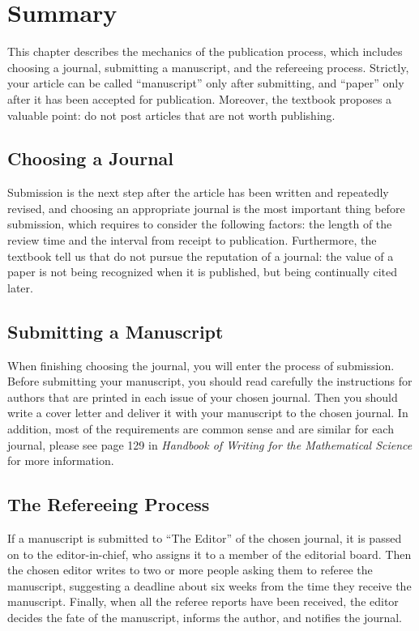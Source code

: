 
\section{Summary}
This chapter describes the mechanics of the publication process, which includes choosing a journal, submitting a manuscript, and the refereeing process. Strictly, your article can be called ``manuscript'' only after submitting, and ``paper'' only after it has been accepted for publication.
Moreover, the textbook proposes a valuable point: do not post articles that are not worth publishing.

\subsection{Choosing a Journal}
Submission is the next step after the article has been written and repeatedly revised, and choosing an appropriate journal is the most important thing before submission, which requires to consider the following factors: the length of the review time and the interval from receipt to publication.
Furthermore, the textbook tell us that do not pursue the reputation of a journal: the value of a paper is not being recognized when it is published, but being continually cited later.


\subsection{Submitting a Manuscript}
When finishing choosing the journal, you will enter the process of submission. Before submitting your manuscript, you should read carefully the instructions for authors that are printed in each issue of your chosen journal. Then you should write a cover letter and deliver it with your manuscript to the chosen journal.
In addition, most of the requirements are common sense and are similar for each journal, please see page 129 in \emph{Handbook of Writing for the Mathematical Science} for more information.


\subsection{The Refereeing Process}
If a manuscript is submitted to ``The Editor'' of the chosen journal, it is passed on to the editor-in-chief, who assigns it to a member of the editorial board. Then the chosen editor writes to two or more people asking them to referee the manuscript, suggesting a deadline about six weeks from the time they receive the manuscript. Finally, when all the referee reports have been received, the editor decides the fate of the manuscript, informs the author, and notifies the journal.

